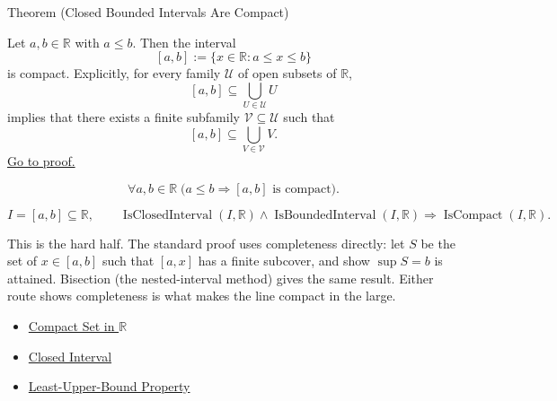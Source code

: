 \begin{theorembox}{Theorem (Closed Bounded Intervals Are Compact)}
\begin{theorem}
\label{thm:closed-bounded-interval-compact}
Let $a,b\in\mathbb{R}$ with $a\leq b$.  Then the interval
\[
  [a,b]:=\{x\in\mathbb{R}:a\leq x\leq b\}
\]
is compact.  Explicitly, for every family $\mathcal{U}$ of open subsets of
$\mathbb{R}$,
\[
  [a,b]\subseteq\bigcup_{U\in\mathcal{U}}U
\]
implies that there exists a finite subfamily $\mathcal{V}\subseteq\mathcal{U}$
such that
\[
  [a,b]\subseteq\bigcup_{V\in\mathcal{V}}V.
\]
\hyperref[prf:closed-bounded-interval-compact]{Go to proof.}
\end{theorem}
\end{theorembox}
\begin{remark*}
\[
\forall a,b\in\mathbb{R}\;\bigl(a\leq b \Longrightarrow [a,b]\text{ is compact}\bigr).
\]
\end{remark*}

\begin{remark*}
\[
I=[a,b]\subseteq\mathbb{R},\qquad
\operatorname{IsClosedInterval}(I,\mathbb{R})\land
\operatorname{IsBoundedInterval}(I,\mathbb{R})
\Longrightarrow
\operatorname{IsCompact}(I,\mathbb{R}).
\]
\end{remark*}
\begin{remark*}[Interpretation]
This is the hard half. The standard proof uses completeness directly: let $S$ be the set of $x\in[a,b]$ such that $[a,x]$ has a finite subcover, and show $\sup S=b$ is attained. Bisection (the nested-interval method) gives the same result. Either route shows completeness is what makes the line compact in the large.
\end{remark*}
\begin{dependencies}
\begin{itemize}
  \item \hyperref[def:compact-set]{Compact Set in $\mathbb{R}$}
  \item \hyperref[def:closed-interval]{Closed Interval}
  \item \hyperref[thm:lub-property-r]{Least-Upper-Bound Property}
\end{itemize}
\end{dependencies}
